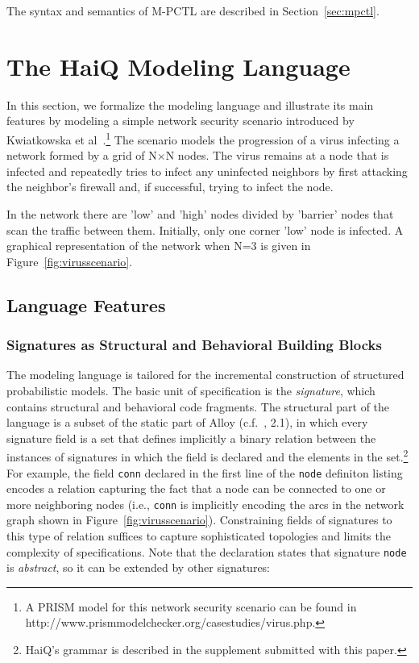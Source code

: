 \documentclass[10pt,journal,compsoc]{IEEEtran}
\begin{document}
The syntax and semantics of M-PCTL are described in Section~\ref{sec:mpctl}.

\section{The {\sf HaiQ} Modeling Language}
\label{sec:haiq}

In this section, we formalize the modeling language and illustrate its main features by modeling a simple network security scenario introduced by Kwiatkowska et al~\cite{KNPV09}.\footnote{A PRISM model for this network security scenario can be found in http://www.prismmodelchecker.org/casestudies/virus.php.} 
The scenario models the progression of a virus infecting a network formed by a grid of N$\times$N nodes. 
The virus remains at a node that is infected and repeatedly tries to infect any uninfected neighbors by first attacking the neighbor's firewall and, if successful, trying to infect the node.

In the network there are 'low' and 'high' nodes divided by 'barrier' nodes that scan the traffic between them. 
Initially, only one corner 'low' node is infected. A graphical representation of the network when N=3 is given in Figure~\ref{fig:virusscenario}.



\subsection{Language Features}

\subsubsection{Signatures as Structural and Behavioral Building Blocks}
The modeling language is tailored for the incremental construction of structured probabilistic models. 
The basic unit of specification is the {\em signature}, which contains structural and behavioral code fragments. 
The structural part of the language is a subset of the static part of Alloy (c.f.~\cite{DBLP:books/daglib/0024034}, 2.1), in which every signature field is a set that defines implicitly a binary relation between the instances of signatures in which the field is declared and the elements in the set.\footnote{{\sf HaiQ}'s grammar is described in the supplement submitted with this paper.} For example, the field {\tt conn} declared in the first line of the {\tt node} definiton listing encodes a relation capturing the fact that a node can be connected to one or more neighboring nodes (i.e., {\tt conn} is implicitly encoding the arcs in the network graph shown in Figure~\ref{fig:virusscenario}). Constraining fields of signatures to this type of relation suffices to capture sophisticated topologies and limits the complexity of specifications. 
Note that the declaration states that signature {\tt node} is {\em abstract}, so it can be extended by other signatures:
\end{document}
